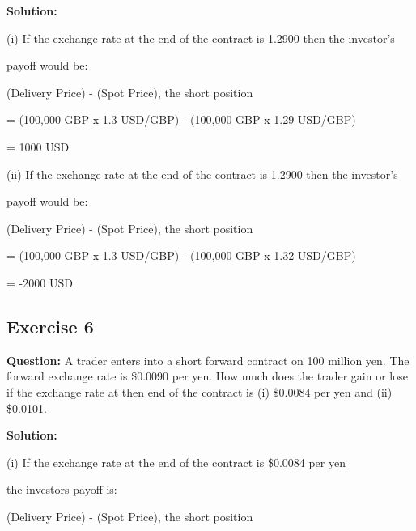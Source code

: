 \documentclass{article}
\begin{document}
\textbf{Solution:}

(i) If the exchange rate at the end of the contract is 1.2900 then the investor's 

payoff would be:

\vspace{\baselineskip}

(Delivery Price) - (Spot Price), the short position

\vspace{\baselineskip}

= (100,000 GBP x 1.3 USD/GBP) - (100,000 GBP x 1.29 USD/GBP)

\vspace{\baselineskip}

= 1000 USD

\vspace{\baselineskip}

(ii) If the exchange rate at the end of the contract is 1.2900 then the investor's 

payoff would be:

\vspace{\baselineskip}

(Delivery Price) - (Spot Price), the short position

\vspace{\baselineskip}

= (100,000 GBP x 1.3 USD/GBP) - (100,000 GBP x 1.32 USD/GBP)

\vspace{\baselineskip}

= -2000 USD


\subsection*{Exercise 6}

\textbf{Question:} A trader enters into a short forward contract on 100 million yen. The forward exchange rate is \$0.0090 per yen. How much does the trader gain or lose if the exchange rate at then end of the contract is (i) \$0.0084 per yen and (ii) \$0.0101.

\textbf{Solution:}

(i) If the exchange rate at the end of the contract is \$0.0084 per yen

the investors payoff is:

\vspace{\baselineskip}

(Delivery Price) - (Spot Price), the short position
\end{document}
